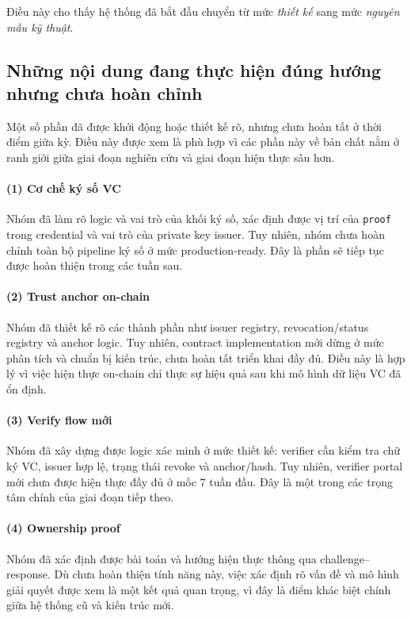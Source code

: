 Điều này cho thấy hệ thống đã bắt đầu chuyển từ mức \textit{thiết kế} sang mức \textit{nguyên mẫu kỹ thuật}.

\subsection{Những nội dung đang thực hiện đúng hướng nhưng chưa hoàn chỉnh}
Một số phần đã được khởi động hoặc thiết kế rõ, nhưng chưa hoàn tất ở thời điểm giữa kỳ. Điều này được xem là phù hợp vì các phần này về bản chất nằm ở ranh giới giữa giai đoạn nghiên cứu và giai đoạn hiện thực sâu hơn.

\paragraph{(1) Cơ chế ký số VC}
Nhóm đã làm rõ logic và vai trò của khối ký số, xác định được vị trí của \texttt{proof} trong credential và vai trò của private key issuer. Tuy nhiên, nhóm chưa hoàn chỉnh toàn bộ pipeline ký số ở mức production-ready. Đây là phần sẽ tiếp tục được hoàn thiện trong các tuần sau.

\paragraph{(2) Trust anchor on-chain}
Nhóm đã thiết kế rõ các thành phần như issuer registry, revocation/status registry và anchor logic. Tuy nhiên, contract implementation mới dừng ở mức phân tích và chuẩn bị kiến trúc, chưa hoàn tất triển khai đầy đủ. Điều này là hợp lý vì việc hiện thực on-chain chỉ thực sự hiệu quả sau khi mô hình dữ liệu VC đã ổn định.

\paragraph{(3) Verify flow mới}
Nhóm đã xây dựng được logic xác minh ở mức thiết kế: verifier cần kiểm tra chữ ký VC, issuer hợp lệ, trạng thái revoke và anchor/hash. Tuy nhiên, verifier portal mới chưa được hiện thực đầy đủ ở mốc 7 tuần đầu. Đây là một trong các trọng tâm chính của giai đoạn tiếp theo.

\paragraph{(4) Ownership proof}
Nhóm đã xác định được bài toán và hướng hiện thực thông qua challenge--response. Dù chưa hoàn thiện tính năng này, việc xác định rõ vấn đề và mô hình giải quyết được xem là một kết quả quan trọng, vì đây là điểm khác biệt chính giữa hệ thống cũ và kiến trúc mới.

